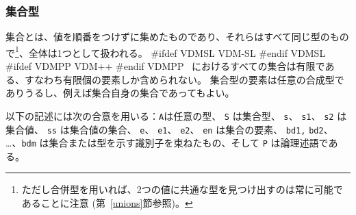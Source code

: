 \documentclass[\pformat,12pt]{jarticle}
\newcommand{\vdmslpp}[2]{%
#ifdef VDMSL
#1
#endif VDMSL
#ifdef VDMPP
#2
#endif VDMPP
}
\newcommand{\vdmsl}{VDM-SL}
\newcommand{\vdmpp}{VDM++}
\begin{document}
\subsubsection{集合型}
\label{sets}

集合とは、値を順番をつけずに集めたものであり、それらはすべて同じ型のもので\footnote{ただし合併型を用いれば、2つの値に共通な型を見つけ出すのは常に可能であることに注意 (第~\ref{unions}節参照)。}、全体は1つとして扱われる。
\vdmslpp{\vdmsl}{\vdmpp}\ におけるすべての集合は有限である、すなわち有限個の要素しか含められない。 
集合型の要素は任意の合成型でありうるし、例えば集合自身の集合であってもよい。

以下の記述には次の合意を用いる：{\tt A}は任意の型、 {\tt S} は集合型、 {\tt s}、 {\tt s1}、 {\tt s2} は集合値、 {\tt ss} は集合値の集合、 {\tt e}、 {\tt e1}、 {\tt e2}、 {\tt en} は集合の要素、 {\tt bd1,} {\tt bd2}、 \ldots、{\tt bdm} は集合または型を示す識別子を束ねたもの、そして {\tt P} は論理述語である。
\end{document}
